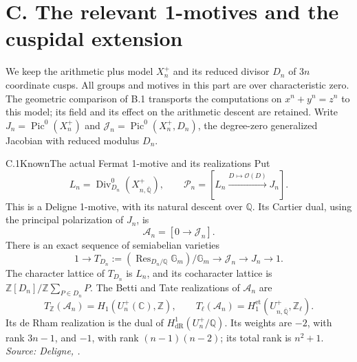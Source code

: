\section{C. The relevant 1-motives and the cuspidal extension}

We keep the arithmetic plus model \(X_n^+\) and its reduced divisor
\(D_n\) of \(3n\) coordinate cusps. All groups and motives in this
part are over characteristic zero. The geometric comparison of B.1
transports the computations on \(x^n+y^n=z^n\) to this model; its
field and its effect on the arithmetic descent are retained.
Write \(J_n=\operatorname{Pic}^0(X_n^+)\) and
\(\mathcal J_n=\operatorname{Pic}^0(X_n^+,D_n)\), the degree-zero
generalized Jacobian with reduced modulus \(D_n\).

\begin{statement}{C.1}{Known}{The actual Fermat 1-motive and its realizations}
Put
\[
 L_n=\operatorname{Div}^0_{D_n}(X_{n,\overline{\mathbb Q}}^+),\qquad
 \mathcal P_n=[L_n\xrightarrow{D\mapsto\mathcal O(D)}J_n].
\]
This is a Deligne 1-motive, with its natural descent over \(\mathbb Q\).
Its Cartier dual, using the principal polarization of \(J_n\), is
\[
 \mathcal A_n=[0\longrightarrow\mathcal J_n].
\]
There is an exact sequence of semiabelian varieties
\[
 1\longrightarrow
 T_{D_n}:=(\operatorname{Res}_{D_n/\mathbb Q}\mathbb G_m)/\mathbb G_m
 \longrightarrow\mathcal J_n\longrightarrow J_n\longrightarrow1.
                                                               \tag{C.1}
\]
The character lattice of \(T_{D_n}\) is \(L_n\), and its cocharacter
lattice is \(\mathbb Z[D_n]/\mathbb Z\sum_{P\in D_n}P\).
The Betti and Tate realizations of \(\mathcal A_n\) are
\[
 T_{\mathbb Z}(\mathcal A_n)=H_1(U_n^+(\mathbb C),\mathbb Z),\qquad
 T_\ell(\mathcal A_n)=
 H_1^{\mathrm{et}}(U_{n,\overline{\mathbb Q}}^+,\mathbb Z_\ell).
                                                               \tag{C.2}
\]
Its de Rham realization is the dual of
\(H^1_{\mathrm{dR}}(U_n^+/\mathbb Q)\).
Its weights are \(-2\), with rank \(3n-1\), and \(-1\), with
rank \((n-1)(n-2)\); its total rank is \(n^2+1\).
\emph{Source: Deligne, \cite[10.1.3--10.1.8, 10.2.10--10.2.11,
10.3.4--10.3.8]{DeligneHodgeIII}.}
\end{statement}
